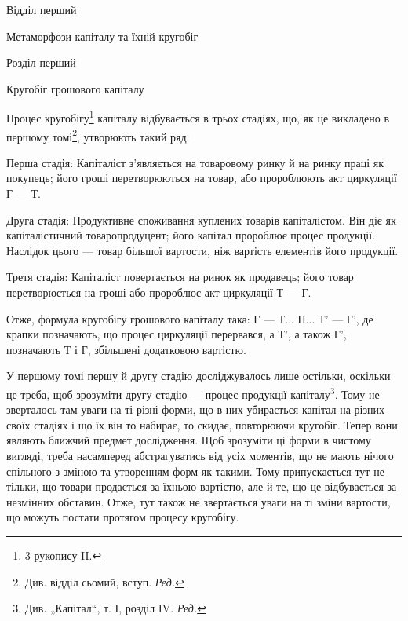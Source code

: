 \parcont{}  %
Відділ перший

Метаморфози капіталу та їхній кругобіг

Розділ перший

Кругобіг грошового капіталу

Процес кругобігу\footnote{
3 рукопису II.
} капіталу відбувається в трьох стадіях, що, як
це викладено в першому томі\footnote*{
Див. відділ сьомий, вступ. \emph{Ред.}
}, утворюють такий ряд:

Перша стадія: Капіталіст з’являється на товаровому ринку й на
ринку праці як покупець; його гроші перетворюються на товар, або пророблюють
акт циркуляції Г — Т.

Друга стадія: Продуктивне споживання куплених товарів капіталістом.
Він діє як капіталістичний товаропродуцент; його капітал пророблює
процес продукції. Наслідок цього — товар більшої вартости, ніж
вартість елементів його продукції.

Третя стадія: Капіталіст повертається на ринок як продавець; його
товар перетворюється на гроші або пророблює акт циркуляції Т — Г.

Отже, формула кругобігу грошового капіталу така: Г — Т... П... Т' —
Г', де крапки позначають, що процес циркуляції перервався, а Т', а
також Г', позначають Т і Г, збільшені додатковою вартістю.

У першому томі першу й другу стадію досліджувалось лише остільки,
оскільки це треба, щоб зрозуміти другу стадію — процес продукції капіталу\footnote*{
Див. „Капітал“, т. І, розділ IV. \emph{Ред.}
}.
Тому не зверталось там уваги на ті різні форми, що в них убирається
капітал на різних своїх стадіях і що їх він то набирає, то скидає,
повторюючи кругобіг. Тепер вони являють ближчий предмет дослідження.
Щоб зрозуміти ці форми в чистому вигляді, треба насамперед абстрагуватись
від усіх моментів, що не мають нічого спільного з зміною та
утворенням форм як такими. Тому припускається тут не тільки, що товари
продається за їхньою вартістю, але й те, що це відбувається за
незмінних обставин. Отже, тут також не звертається уваги на ті зміни
вартости, що можуть постати протягом процесу кругобігу.
